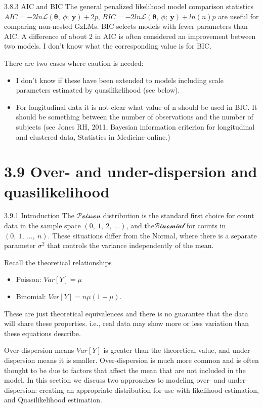 \documentclass[
  9pt,
  ignorenonframetext,
]{beamer}
\begin{document}
\begin{frame}{3.8.3 AIC and BIC}
\protect\hypertarget{aic-and-bic}{}
The general penalized likelihood model comparison statistics
\(AIC=-2 ln \mathcal L(\pmb \theta,\ \phi;\ \pmb y)+2p\),
\(BIC=-2 ln \mathcal L(\pmb \theta,\ \phi;\ \pmb y)+ln(n)p\) are useful
for comparing non-nested GzLMs. BIC selects models with fewer parameters
than AIC. A difference of about 2 in AIC is often considered an
improvement between two models. I don't know what the corresponding
value is for BIC.

There are two cases where caution is needed:

\begin{itemize}
\item
  I don't know if these have been extended to models including scale
  parameters estimated by quasilikelihood (see below).
\item
  For longitudinal data it is not clear what value of n should be used
  in BIC. It should be something between the number of observations and
  the number of subjects (see Jones RH, 2011, Bayesian information
  criterion for longitudinal and clustered data, Statistics in Medicine
  online.)
\end{itemize}
\end{frame}

\hypertarget{over--and-under-dispersion-and-quasilikelihood}{%
\section{3.9 Over- and under-dispersion and
quasilikelihood}\label{over--and-under-dispersion-and-quasilikelihood}}

\begin{frame}{3.9.1 Introduction}
\protect\hypertarget{introduction-1}{}
The \(\mathcal {Poisson}\) distribution is the standard first choice for
count data in the sample space \((0,\ 1,\ 2,\ ...)\), and
the\(\mathcal {Binomial}\) for counts in \((0,\ 1,\ ...,\ n)\). These
situations differ from the Normal, where there is a separate parameter
\(\sigma^2\) that controls the variance independently of the mean.

Recall the theoretical relationships

\begin{itemize}
\item
  Poisson: \(Var[Y]=\mu\)
\item
  Binomial: \(Var[Y]= n\mu(1-\mu)\).
\end{itemize}

These are just theoretical equivalences and there is no guarantee that
the data will share these properties. i.e., real data may show more or
less variation than these equations describe.

Over-dispersion means \(Var[Y]\) is greater than the theoretical value,
and under-dispersion means it is smaller. Over-dispersion is much more
common and is often thought to be due to factors that affect the mean
that are not included in the model. In this section we discuss two
approaches to modeling over- and under-dispersion: creating an
appropriate distribution for use with likelihood estimation, and
Quasilikelihood estimation.
\end{frame}
\end{document}
